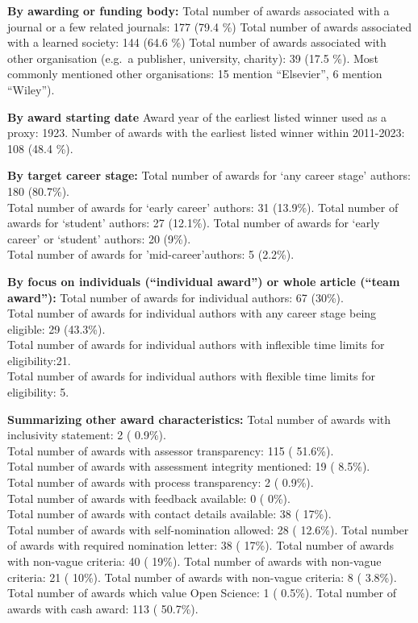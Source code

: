 \documentclass[
]{article}
\begin{document}
\textbf{By awarding or funding body:} Total number of awards associated
with a journal or a few related journals: 177 (79.4 \%) Total number of
awards associated with a learned society: 144 (64.6 \%) Total number of
awards associated with other organisation (e.g.~a publisher, university,
charity): 39 (17.5 \%). Most commonly mentioned other organisations: 15
mention ``Elsevier'', 6 mention ``Wiley'').

\textbf{By award starting date} Award year of the earliest listed winner
used as a proxy: 1923. Number of awards with the earliest listed winner
within 2011-2023: 108 (48.4 \%).

\textbf{By target career stage:} Total number of awards for `any career
stage' authors: 180 (80.7\%).\\
Total number of awards for `early career' authors: 31 (13.9\%). Total
number of awards for `student' authors: 27 (12.1\%). Total number of
awards for `early career' or `student' authors: 20 (9\%).\\
Total number of awards for 'mid-career'authors: 5 (2.2\%).

\textbf{By focus on individuals (``individual award'') or whole article
(``team award''):} Total number of awards for individual authors: 67
(30\%).\\
Total number of awards for individual authors with any career stage
being eligible: 29 (43.3\%).\\
Total number of awards for individual authors with inflexible time
limits for eligibility:21.\\
Total number of awards for individual authors with flexible time limits
for eligibility: 5.

\textbf{Summarizing other award characteristics:} Total number of awards
with inclusivity statement: 2 ( 0.9\%).\\
Total number of awards with assessor transparency: 115 ( 51.6\%).\\
Total number of awards with assessment integrity mentioned: 19 (
8.5\%).\\
Total number of awards with process transparency: 2 ( 0.9\%).\\
Total number of awards with feedback available: 0 ( 0\%).\\
Total number of awards with contact details available: 38 ( 17\%).\\
Total number of awards with self-nomination allowed: 28 ( 12.6\%). Total
number of awards with required nomination letter: 38 ( 17\%). Total
number of awards with non-vague criteria: 40 ( 19\%). Total number of
awards with non-vague criteria: 21 ( 10\%). Total number of awards with
non-vague criteria: 8 ( 3.8\%). Total number of awards which value Open
Science: 1 ( 0.5\%). Total number of awards with cash award: 113 (
50.7\%).
\end{document}
